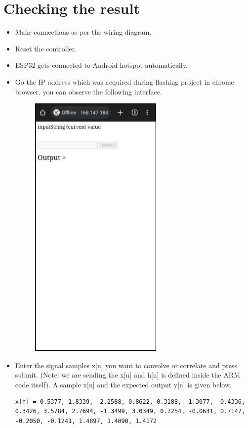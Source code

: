 \documentclass[journal,12pt,twocolumn]{IEEEtran}
\begin{document}
\section{Checking the result}
\begin{itemize}
    \item Make connections as per the wiring diagram.
    \item Reset the controller.
    \item ESP32 gets connected to Android hotspot automatically.
    \item Go the IP address which was acquired during flashing project in chrome browser. you can observe the following interface.
    \begin{figure}[ht]
    \centering
    \includegraphics[width = 6.5cm]{Figures/Fig1.png}
    \end{figure}
    \newpage
    \item Enter the signal samples x[n] you want to convolve or correlate and press submit. (Note: we are sending the x[n] and h[n] is defined inside the ARM code itself). A sample x[n] and the expected output y[n] is given below.
    \begin{lstlisting}
x[n] = 0.5377, 1.8339, -2.2588, 0.8622, 0.3188, -1.3077, -0.4336, 0.3426, 3.5784, 2.7694, -1.3499, 3.0349, 0.7254, -0.0631, 0.7147, -0.2050, -0.1241, 1.4897, 1.4090, 1.4172

\end{lstlisting}
\end{itemize}
\end{document}
